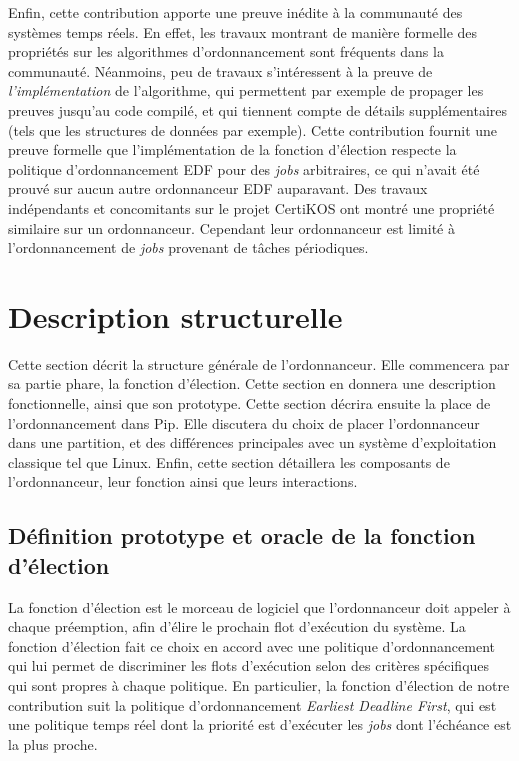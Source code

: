 	Enfin, cette contribution apporte une preuve inédite à la communauté des systèmes temps réels. En effet, les travaux montrant de manière formelle des propriétés sur les algorithmes d'ordonnancement sont fréquents dans la communauté. Néanmoins, peu de travaux s'intéressent à la preuve de \emph{l'implémentation} de l'algorithme, qui permettent par exemple de propager les preuves jusqu'au code compilé, et qui tiennent compte de détails supplémentaires (tels que les structures de données par exemple). Cette contribution fournit une preuve formelle que l'implémentation de la fonction d'élection respecte la politique d'ordonnancement EDF pour des \emph{jobs} arbitraires, ce qui n'avait été prouvé sur aucun autre ordonnanceur EDF auparavant. Des travaux indépendants et concomitants sur le projet CertiKOS ont montré une propriété similaire sur un ordonnanceur. Cependant leur ordonnanceur est limité à l'ordonnancement de \emph{jobs} provenant de tâches périodiques.

	\section{Description structurelle}

		Cette section décrit la structure générale de l'ordonnanceur. Elle commencera par sa partie phare, la fonction d'élection. Cette section en donnera une description fonctionnelle, ainsi que son prototype. Cette section décrira ensuite la place de l'ordonnancement dans Pip. Elle discutera du choix de placer l'ordonnanceur dans une partition, et des différences principales avec un système d'exploitation classique tel que Linux. Enfin, cette section détaillera les composants de l'ordonnanceur, leur fonction ainsi que leurs interactions.

		\subsection{Définition prototype et oracle de la fonction d'élection}

		La fonction d'élection est le morceau de logiciel que l'ordonnanceur doit appeler à chaque préemption, afin d'élire le prochain flot d'exécution du système. La fonction d'élection fait ce choix en accord avec une politique d'ordonnancement qui lui permet de discriminer les flots d'exécution selon des critères spécifiques qui sont propres à chaque politique. En particulier, la fonction d'élection de notre contribution suit la politique d'ordonnancement \emph{Earliest Deadline First}, qui est une politique temps réel dont la priorité est d'exécuter les \emph{jobs} dont l'échéance est la plus proche.

